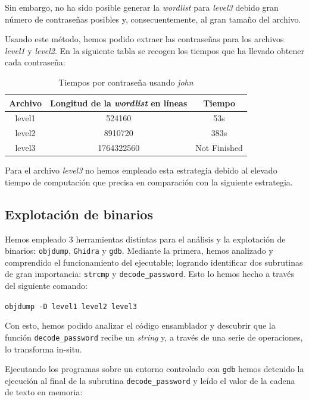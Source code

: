 \documentclass[]{article}
\begin{document}
Sin embargo, no ha sido posible generar la \textit{wordlist} para \textit{level3} debido gran número de contraseñas posibles y, consecuentemente, al gran tamaño del archivo.

Usando este método, hemos podido extraer las contraseñas para los archivos \textit{level1} y \textit{level2}. En la siguiente tabla se recogen los tiempos que ha llevado obtener cada contraseña: 
\begin{table}[H]
\begin{centering}
    \begin{tabular}{|c|c|c|}
        \hline
        Archivo & Longitud de la \textit{wordlist} en líneas & Tiempo\\
        \hline
        level1 & 524160 & 53s\\ 
        level2 & 8910720 & 383s\\
        level3 & 1764322560 & Not Finished\\
        \hline
    \end{tabular}
    \caption {\small Tiempos por contraseña usando \textit{john}}
\end{centering}
\end{table}

Para el archivo \textit{level3} no hemos empleado esta estrategia debido al elevado tiempo de computación que precisa en comparación con la siguiente estrategia.

\subsection{Explotación de binarios}
\label{subsec:binary}
Hemos empleado 3 herramientas distintas para el análisis y la explotación de binarios: \texttt{objdump}, \texttt{Ghidra} y \texttt{gdb}. Mediante la primera, hemos analizado y comprendido el funcionamiento del ejecutable; logrando identificar dos subrutinas de gran importancia: \texttt{strcmp} y \texttt{decode\_password}. Esto lo hemos hecho a través del siguiente comando:

\begin{center}\texttt{objdump -D level1 level2 level3}\end{center}

Con esto, hemos podido analizar el código ensamblador y descubrir que la función \texttt{decode\_password} recibe un \textit{string} y, a través de una serie de operaciones, lo transforma in-situ.

Ejecutando los programas sobre un entorno controlado con \texttt{gdb} hemos detenido la ejecución al final de la subrutina \texttt{decode\_password} y leído el valor de la cadena de texto en memoria:
\end{document}
